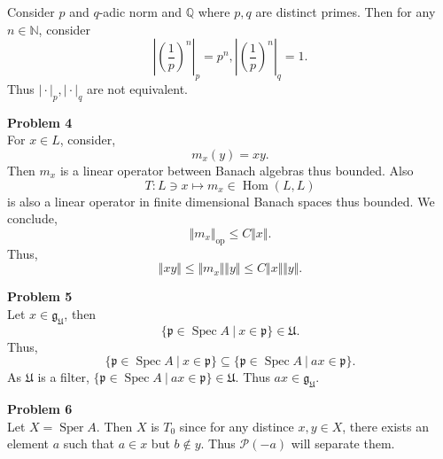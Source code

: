 \documentclass[10pt]{article}
\DeclareMathOperator{\Hom}{Hom}
\DeclareMathOperator{\Spec}{Spec}
\DeclareMathOperator{\Sper}{Sper}
\DeclareMathOperator{\op}{op}
\newcommand{\norm}[1]{\Vert #1 \Vert}
\newcommand{\N}[0]{\mathbb{N}}
\newcommand{\Q}[0]{\mathbb{Q}}
\newcommand{\sep}[0]{\:|\:}
\newcommand{\ab}[1]{\vert #1 \vert}
\newcommand{\g}[0]{\mathfrak{g}}
\newcommand{\p}[0]{\mathfrak{p}}
\newcommand{\U}[0]{\mathfrak{U}}
\begin{document}
Consider $p$ and $q$-adic norm and $\Q$ where $p,q$ are distinct primes. Then for any $n\in \N$, consider
\begin{equation*}
    \left\vert\left({\frac 1 p}\right)^n\right\vert_p = p^n,\left\vert\left({\frac 1 p}\right)^n\right\vert_q = 1.
\end{equation*}
Thus $\ab{\cdot}_p,\ab{\cdot}_q$ are not equivalent.
\par\textbf{Problem 4}\\
For $x\in L$, consider,
\begin{equation*}
    m_x(y) = xy.
\end{equation*}
Then $m_x$ is a linear operator between Banach algebras thus bounded. Also 
\begin{equation*}
    T:L\ni x\mapsto m_x \in \Hom(L,L)
\end{equation*}
is also a linear operator in finite dimensional Banach spaces thus bounded. We conclude,
\begin{equation*}
    \norm{m_x}_{\op}\leq C\norm{x}.
\end{equation*} 
Thus,
\begin{equation*}
    \norm{xy}\leq \norm{m_x}\norm{y}\leq C\norm{x}\norm{y}.
\end{equation*}
\par\textbf{Problem 5}\\
Let $x\in\g_\U$, then 
\begin{equation*}
    \{\p\in\Spec A\sep x\in\p\}\in\U.
\end{equation*}
Thus,
\begin{equation*}
    \{\p\in\Spec A\sep x\in\p\}\subseteq\{\p\in\Spec A\sep ax\in\p\}.
\end{equation*}
As $\U$ is a filter, $\{\p\in\Spec A\sep ax\in\p\}\in\U$. Thus $ax\in\g_\U$.
\par\textbf{Problem 6}\\
Let $X=\Sper A$. Then $X$ is $T_0$ since for any distince $x,y\in X$, there exists an element $a$ such that $a\in x$ but $b\not\in y$. Thus $\mathcal{P}(-a)$ will separate them.
\end{document}

